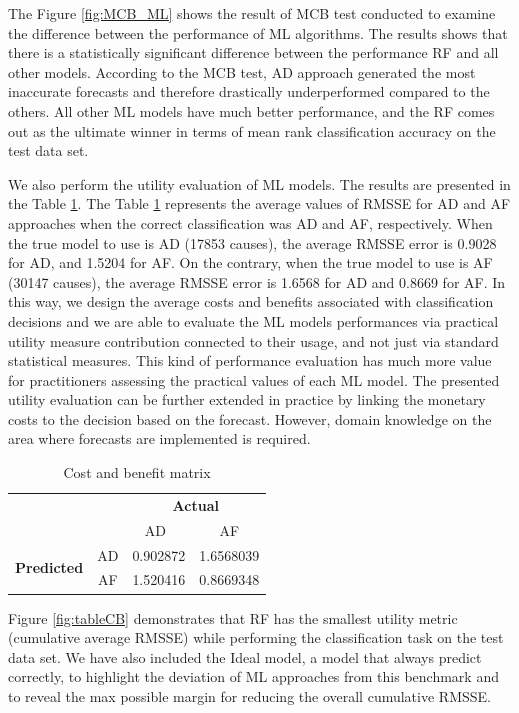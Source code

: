 \documentclass[preprint, 3p,
authoryear]{elsarticle} %
\begin{document}
The Figure \ref{fig:MCB_ML} shows the result of MCB test conducted to
examine the difference between the performance of ML algorithms. The
results shows that there is a statistically significant difference
between the performance RF and all other models. According to the MCB
test, AD approach generated the most inaccurate forecasts and therefore
drastically underperformed compared to the others. All other ML models
have much better performance, and the RF comes out as the ultimate
winner in terms of mean rank classification accuracy on the test data
set.

We also perform the utility evaluation of ML models. The results are
presented in the Table \ref{tab:matrix}. The Table \ref{tab:matrix}
represents the average values of RMSSE for AD and AF approaches when the
correct classification was AD and AF, respectively. When the true model
to use is AD (17853 causes), the average RMSSE error is 0.9028 for AD,
and 1.5204 for AF. On the contrary, when the true model to use is AF
(30147 causes), the average RMSSE error is 1.6568 for AD and 0.8669 for
AF. In this way, we design the average costs and benefits associated
with classification decisions and we are able to evaluate the ML models
performances via practical utility measure contribution connected to
their usage, and not just via standard statistical measures. This kind
of performance evaluation has much more value for practitioners
assessing the practical values of each ML model. The presented utility
evaluation can be further extended in practice by linking the monetary
costs to the decision based on the forecast. However, domain knowledge
on the area where forecasts are implemented is required.

\begin{table}
\caption{\label{tab:matrix}Cost and benefit matrix}
\centering
\begin{tabular}[t]{lccc}

\multicolumn{2}{c}{} & \multicolumn{2}{c}{\bf Actual}\\ 
\cline{3-4}
& & AD\  & AF\\
\hline
\multirow{2}{4em}{\bf Predicted} & AD & 0.902872 & 1.6568039\\
& AF & 1.520416 & 0.8669348\\
\hline
\end{tabular}
\end{table}

Figure \ref{fig:tableCB} demonstrates that RF has the smallest utility
metric (cumulative average RMSSE) while performing the classification
task on the test data set. We have also included the Ideal model, a
model that always predict correctly, to highlight the deviation of ML
approaches from this benchmark and to reveal the max possible margin for
reducing the overall cumulative RMSSE.
\end{document}
